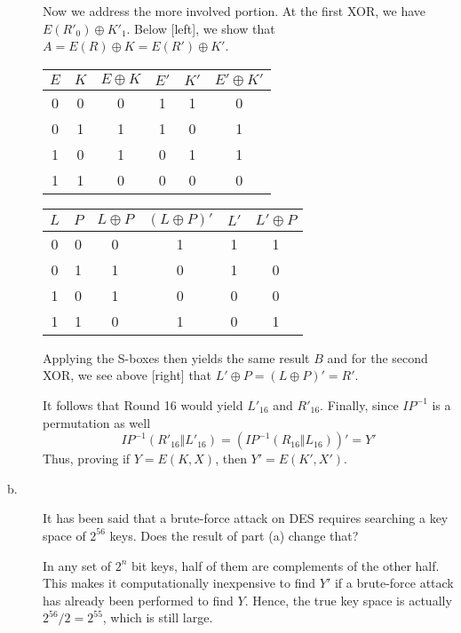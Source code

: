\documentclass[../hw_sols.tex]{subfiles}
\begin{document}
\begin{description}
\begin{solution}
Now we address the more involved portion. At the first XOR, we have $E(R'_0) \oplus K'_1$. Below [left], we show that $A = E(R) \oplus K = E(R') \oplus K'$.
\begin{center}
	\begin{tabular}{ *{6}{ c } }
		$E$ & $K$ & $E \oplus K$ & $E'$ & $K'$ & $E' \oplus K'$ \\
		\hline
		0 & 0 & \cellcolor{yellow!75} 0 & 1 & 1 & \cellcolor{yellow!75} 0 \\
		0 & 1 & \cellcolor{yellow!75} 1 & 1 & 0 & \cellcolor{yellow!75} 1 \\
		1 & 0 & \cellcolor{yellow!75} 1 & 0 & 1 & \cellcolor{yellow!75} 1 \\
		1 & 1 & \cellcolor{yellow!75} 0 & 0 & 0 & \cellcolor{yellow!75} 0 
	\end{tabular}
	\hspace{1cm}
	\begin{tabular}{ *{6}{ c } }
		$L$ & $P$ & $L \oplus P$ & $(L \oplus P)'$ & $L'$ & $L' \oplus P$ \\
		\hline
		0 & 0 & 0 & \cellcolor{yellow!75} 1 & 1 & \cellcolor{yellow!75} 1 \\
		0 & 1 & 1 & \cellcolor{yellow!75} 0 & 1 & \cellcolor{yellow!75} 0 \\
		1 & 0 & 1 & \cellcolor{yellow!75} 0 & 0 & \cellcolor{yellow!75} 0 \\
		1 & 1 & 0 & \cellcolor{yellow!75} 1 & 0 & \cellcolor{yellow!75} 1 
	\end{tabular}
\end{center}
Applying the S-boxes then yields the same result $B$ and for the second XOR, we see above [right] that \newline $L' \oplus P = (L \oplus P)' = R'$.

It follows that Round 16 would yield $L'_{16}$ and $R'_{16}$. Finally, since $IP^{-1}$ is a permutation as well
	$$IP^{-1}(R'_{16} \Vert L'_{16}) = (IP^{-1}(R_{16} \Vert L_{16}))' = Y'$$
Thus, proving if $Y = E(K,X)$, then $Y' = E(K',X')$.
\end{solution}
	
\item[b.] It has been said that a brute-force attack on DES requires searching a key space of $2^{56}$ keys. Does the result of part (a) change that?

\begin{solution}
In any set of $2^n$ bit keys, half of them are complements of the other half. This makes it computationally inexpensive to find $Y'$ if a brute-force attack has already been performed to find $Y$. Hence, the true key space is actually $2^{56}/2 = 2^{55}$, which is still large.
\end{solution}

\end{description}
\end{document}
